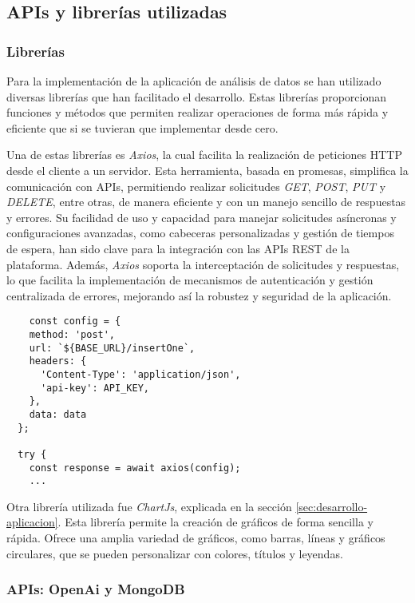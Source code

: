 \subsection{APIs y librerías utilizadas}
\label{sec:apis-librerias}

\subsubsection{Librerías}
\label{sec:librerias}

Para la implementación de la aplicación de análisis de datos se han utilizado diversas librerías que han facilitado el desarrollo. 
Estas librerías proporcionan funciones y métodos que permiten realizar operaciones de forma más rápida y eficiente que si se 
tuvieran que implementar desde cero.

Una de estas librerías es \textit{Axios}, la cual facilita la realización de peticiones HTTP desde el cliente a un servidor. 
Esta herramienta, basada en promesas, simplifica la comunicación con APIs, permitiendo realizar solicitudes \textit{GET}, 
\textit{POST}, \textit{PUT} y \textit{DELETE}, entre otras, de manera eficiente y con un manejo sencillo de respuestas y errores. 
Su facilidad de uso y capacidad para manejar solicitudes asíncronas y configuraciones avanzadas, como cabeceras personalizadas 
y gestión de tiempos de espera, han sido clave para la integración con las APIs REST de la plataforma. Además, \textit{Axios} 
soporta la interceptación de solicitudes y respuestas, lo que facilita la implementación de mecanismos de autenticación y gestión 
centralizada de errores, mejorando así la robustez y seguridad de la aplicación.

\begin{verbatim}
    const config = {
    method: 'post',
    url: `${BASE_URL}/insertOne`,
    headers: {
      'Content-Type': 'application/json',
      'api-key': API_KEY,
    },
    data: data
  };

  try {
    const response = await axios(config);
    ...
\end{verbatim}

Otra librería utilizada fue \textit{ChartJs}, explicada en la sección \ref{sec:desarrollo-aplicacion}. Esta librería permite la 
creación de gráficos de forma sencilla y rápida. Ofrece una amplia variedad de gráficos, como barras, líneas y gráficos circulares, 
que se pueden personalizar con colores, títulos y leyendas.

\subsubsection{APIs: OpenAi y MongoDB}
\label{sec:apis}


